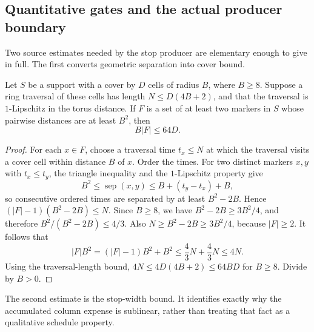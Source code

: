 \subsection{Quantitative gates and the actual producer boundary}

Two source estimates needed by the stop producer are elementary enough to give in full. The first converts geometric separation into cover bound.

\begin{lemma}\label{ex-centered-cover-price}
Let $S$ be a support with a cover by $D$ cells of radius $B$, where $B\geq8$. Suppose a ring traversal of these cells has length $N\leq D(4B+2)$, and that the traversal is $1$-Lipschitz in the torus distance. If $F$ is a set of at least two markers in $S$ whose pairwise distances are at least $B^2$, then
\[
 B|F|\leq64D.
\]
\end{lemma}
\begin{proof}
For each $x\in F$, choose a traversal time $t_x\leq N$ at which the traversal visits a cover cell within distance $B$ of $x$. Order the times. For two distinct markers $x,y$ with $t_x\leq t_y$, the triangle inequality and the $1$-Lipschitz property give
\[
 B^2\leq \operatorname{sep}(x,y)
 \leq B+(t_y-t_x)+B,
\]
so consecutive ordered times are separated by at least $B^2-2B$. Hence $(|F|-1)(B^2-2B)\leq N$. Since $B\geq8$, we have $B^2-2B\geq3B^2/4$, and therefore $B^2/(B^2-2B)\leq4/3$. Also $N\geq B^2-2B\geq3B^2/4$, because $|F|\geq2$. It follows that
\[
 |F|B^2=(|F|-1)B^2+B^2\leq\frac43N+\frac43N\leq4N.
\]
Using the traversal-length bound, $4N\leq4D(4B+2)\leq64BD$ for $B\geq8$. Divide by $B>0$.
\end{proof}

The second estimate is the stop-width bound. It identifies exactly why the accumulated column expense is sublinear, rather than treating that fact as a qualitative schedule property.

